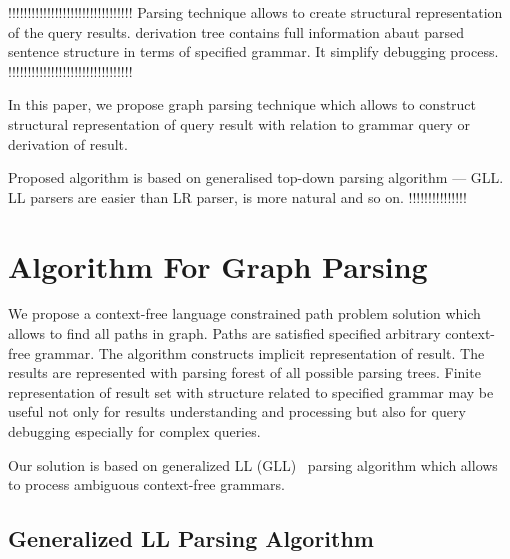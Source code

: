 \documentclass{sig-alternate} %
\begin{document}
!!!!!!!!!!!!!!!!!!!!!!!!!!!!!!!!
Parsing technique allows to create structural representation of the query results. derivation tree contains full information abaut parsed sentence structure in terms of specified grammar. It simplify debugging process. 
!!!!!!!!!!!!!!!!!!!!!!!!!!!!!!!!

In this paper, we propose graph parsing technique which allows to construct structural representation of query result with relation to grammar query or derivation of result.

Proposed algorithm is based on generalised top-down parsing algorithm --- GLL. LL parsers are easier than LR parser, is more natural and so on. !!!!!!!!!!!!!!!





\section{Algorithm For Graph Parsing}
We propose a context-free language constrained path problem solution which allows to find all paths in graph. Paths are satisfied specified arbitrary context-free grammar. The algorithm constructs implicit representation of result. The results are represented with parsing forest of all possible parsing trees. 
Finite representation of result set with structure related to specified grammar may be useful not only for results understanding and processing but also for query debugging especially for complex queries. 

Our solution is based on generalized LL (GLL)~\cite{scott2010gll, FastPracticalGLL} parsing algorithm which allows to process ambiguous context-free grammars.


\subsection{Generalized LL Parsing Algorithm}
\end{document}
